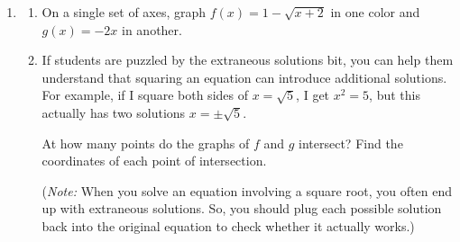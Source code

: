 \documentclass{article}
\begin{document}
\begin{enumerate}
\item 

  \begin{enumerate}
  \item
    \begin{problem}[\vfill]
      On a single set of axes, graph $f(x) = 1 - \sqrt{x + 2}$ in one color and $g(x) = -2x$ in another.
    \end{problem}

    \begin{solution}

      \end{solution}

  \item

    \begin{workshop}
      If students are puzzled by the extraneous solutions bit, you can help them understand that squaring an equation can introduce additional solutions. For example, if I square both sides of $x = \sqrt{5}$, I get $x^2 = 5$, but this actually has two solutions $x = \pm \sqrt{5}$.
    \end{workshop}

    \begin{problem}[\vfill]
      At how many points do the graphs of $f$ and $g$ intersect? Find the coordinates of each point of intersection.

      (\emph{Note:} When you solve an equation involving a square root, you often end up with extraneous solutions. So, you should plug each possible solution back into the original equation to check whether it actually works.)
    \end{problem}


\end{enumerate}
\end{enumerate}
\end{document}
